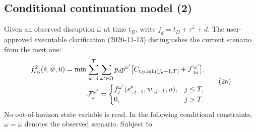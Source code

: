 \documentclass[10pt]{article}
\begin{document}
\subsection*{Conditional continuation model (2)}
Given an observed disruption $\bar\omega$ at time $t_D$, write
$j_d=t_D+\tau^{\bar\omega}+d$. The user-approved executable clarification
(2026-11-13) distinguishes the current scenario from the next one:
\begin{equation}
\begin{aligned}
f_{t_D}^{\bar\omega}(\hat s,\hat w,\hat u)=\min\space{}
\sum_{d=1}^{T}\sum_{\omega'\in\Omega}p_d p^{\omega'}
\bigl[C_{t_D,\min(j_d-1,T)}+\mathcal F_{j_d}^{\omega'}\bigr],\\
\mathcal F_{j}^{\omega'}=
\begin{cases}f_j^{\omega'}(s_{\cdot,j-1}^p,w_{\cdot,j-1},u),&j\leq T,\\
0,&j>T.\end{cases}
\end{aligned}\tag{2a}
\end{equation}
No out-of-horizon state variable is read. In the following conditional
constraints, $\omega=\bar\omega$ denotes the observed scenario.
Subject to
\end{document}

